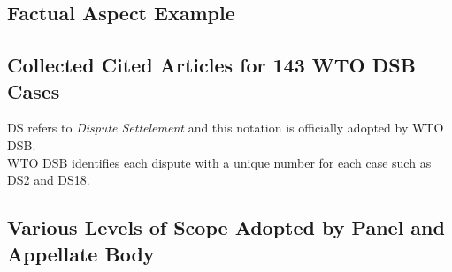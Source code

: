 \documentclass[12pt,letterpaper]{article}
\begin{document}
\begin{appendices}
  \section{}
  \label{sec:appendix}


  \subsection{Factual Aspect Example}
  \label{sub:factual-aspect-example}
  



  \subsection{Collected Cited Articles for 143 WTO DSB Cases}
  DS refers to \textit{Dispute Settelement} and this notation is officially adopted by WTO DSB.\\
  WTO DSB identifies each dispute with a unique number for each case such as DS2 and DS18.
  \label{xltabular:level-of-scopes}
  

  \subsection{Various Levels of Scope Adopted by Panel and Appellate Body}
  \label{sub:cited-articles-table}


\end{appendices}
\end{document}

